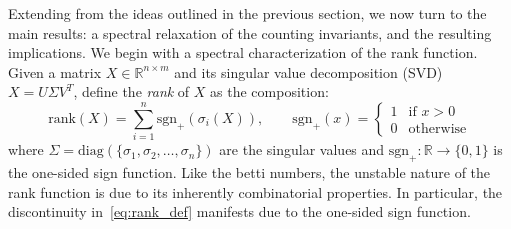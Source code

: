 \documentclass[12pt]{article}
\numberwithin{equation}{section}
\newcommand{\+}{%
	\raisebox{0.18ex}{\scaleobj{0.55}{+}}
}
\theoremstyle{definition}
\begin{document}
Extending from the ideas outlined in the previous section, we now turn to the main results: a spectral relaxation of the counting invariants, and the resulting implications. 
We begin with a spectral characterization of the rank function. Given a matrix $X \in \mathbb{R}^{n \times m}$ and its singular value decomposition (SVD) $X = U \Sigma V^T$, define the \emph{rank} of $X$ as the composition:
\begin{equation}\label{eq:rank_def}
	\mathrm{rank}(X) = \sum\limits_{i=1}^{n} \mathrm{sgn}_+(\sigma_i(X)), \quad \quad \mathrm{sgn}_{+}(x) = \begin{cases}
		1 & \text{if } x > 0 \\
		0 & \text{otherwise}
	\end{cases}
\end{equation}
where $\Sigma = \mathrm{diag}(\{\sigma_1, \sigma_2, \dots, \sigma_n \})$ are the singular values  and $\mathrm{sgn}_+: \mathbb{R} \to \{0, 1\}$ is the one-sided sign function. 
Like the betti numbers, the unstable nature of the rank function is due to its inherently combinatorial properties. In particular, the discontinuity in~\eqref{eq:rank_def} manifests due to the one-sided sign function. 
\end{document}
